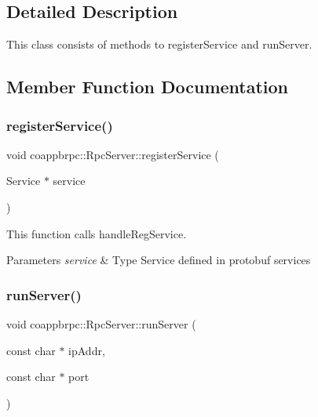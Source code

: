 \subsection{Detailed Description}
This class consists of methods to register\+Service and run\+Server. 

\subsection{Member Function Documentation}
\mbox{\label{classcoappbrpc_1_1RpcServer_acc9877a9bfff6783aa0261942d2917c2}} 
\subsubsection{\texorpdfstring{register\+Service()}{registerService()}}
{\footnotesize\ttfamily void coappbrpc\+::\+Rpc\+Server\+::register\+Service (\begin{DoxyParamCaption}\item[{Service $\ast$}]{service }\end{DoxyParamCaption})}



This function calls handle\+Reg\+Service. 


\begin{DoxyParams}{Parameters}
{\em service} & Type Service defined in protobuf services \\
\hline
\end{DoxyParams}
\mbox{\label{classcoappbrpc_1_1RpcServer_ac1742b534bbb7c0b054c40346c876cf5}} 
\subsubsection{\texorpdfstring{run\+Server()}{runServer()}}
{\footnotesize\ttfamily void coappbrpc\+::\+Rpc\+Server\+::run\+Server (\begin{DoxyParamCaption}\item[{const char $\ast$}]{ip\+Addr,  }\item[{const char $\ast$}]{port }\end{DoxyParamCaption})}



